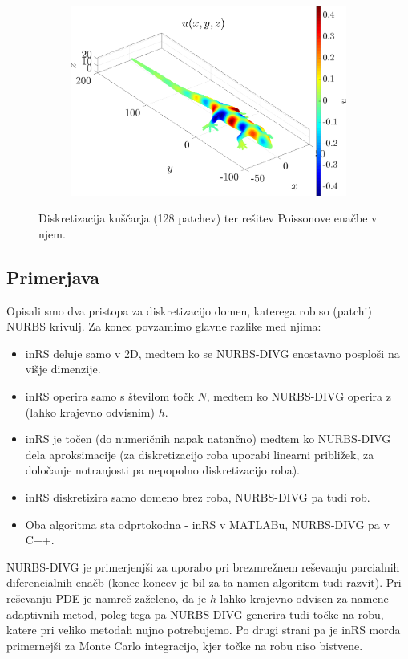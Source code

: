\documentclass{article}
\begin{document}
\begin{figure}[H]
\centering
\begin{subfigure}{.5\textwidth}
\includegraphics[width=\linewidth]{Slike/geko.png}
\end{subfigure}
\caption{Diskretizacija kuščarja (128 patchev) ter rešitev Poissonove enačbe v njem.}
\label{fig:geko}
\end{figure}
\subsection{Primerjava}
Opisali smo dva pristopa za diskretizacijo domen, katerega rob so (patchi) NURBS krivulj.
Za konec povzamimo glavne razlike med njima:
\begin{itemize}
\item inRS deluje samo v 2D, medtem ko se NURBS-DIVG enostavno posploši na višje dimenzije.
\item inRS operira samo s številom točk $N$, medtem ko NURBS-DIVG operira z (lahko krajevno odvisnim) $h$.
\item inRS je točen (do numeričnih napak natančno) medtem ko NURBS-DIVG dela aproksimacije (za diskretizacijo roba uporabi linearni približek, za določanje notranjosti pa nepopolno diskretizacijo roba).
\item inRS diskretizira samo domeno brez roba, NURBS-DIVG pa tudi rob.
\item Oba algoritma sta odprtokodna - inRS v MATLABu, NURBS-DIVG pa v C++.
\end{itemize}
NURBS-DIVG je primerjenjši za uporabo pri brezmrežnem reševanju parcialnih diferencialnih enačb (konec koncev je bil za ta namen algoritem tudi razvit).
Pri reševanju PDE je namreč zaželeno, da je $h$ lahko krajevno odvisen za namene adaptivnih metod, poleg tega pa NURBS-DIVG generira tudi točke na robu, katere pri veliko metodah nujno potrebujemo.
Po drugi strani pa je inRS morda primernejši za Monte Carlo integracijo, kjer točke na robu niso bistvene.
\end{document}
